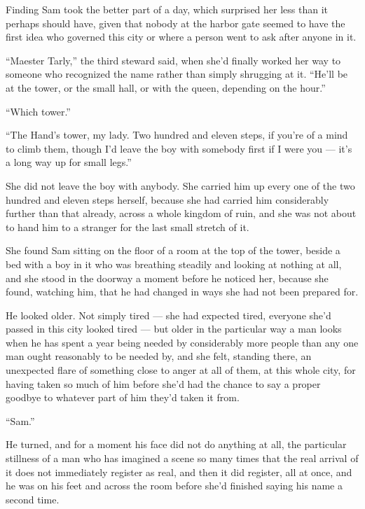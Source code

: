 \sceneBreak

Finding Sam took the better part of a day, which surprised her less than it perhaps should have, given that nobody at the harbor gate seemed to have the first idea who governed this city or where a person went to ask after anyone in it.

“Maester Tarly,” the third steward said, when she’d finally worked her way to someone who recognized the name rather than simply shrugging at it. “He’ll be at the tower, or the small hall, or with the queen, depending on the hour.”

“Which tower.”

“The Hand’s tower, my lady. Two hundred and eleven steps, if you’re of a mind to climb them, though I’d leave the boy with somebody first if I were you — it’s a long way up for small legs.”

She did not leave the boy with anybody. She carried him up every one of the two hundred and eleven steps herself, because she had carried him considerably further than that already, across a whole kingdom of ruin, and she was not about to hand him to a stranger for the last small stretch of it.

\sceneBreak

She found Sam sitting on the floor of a room at the top of the tower, beside a bed with a boy in it who was breathing steadily and looking at nothing at all, and she stood in the doorway a moment before he noticed her, because she found, watching him, that he had changed in ways she had not been prepared for.

He looked older. Not simply tired — she had expected tired, everyone she’d passed in this city looked tired — but older in the particular way a man looks when he has spent a year being needed by considerably more people than any one man ought reasonably to be needed by, and she felt, standing there, an unexpected flare of something close to anger at all of them, at this whole city, for having taken so much of him before she’d had the chance to say a proper goodbye to whatever part of him they’d taken it from.

“Sam.”

He turned, and for a moment his face did not do anything at all, the particular stillness of a man who has imagined a scene so many times that the real arrival of it does not immediately register as real, and then it did register, all at once, and he was on his feet and across the room before she’d finished saying his name a second time.

